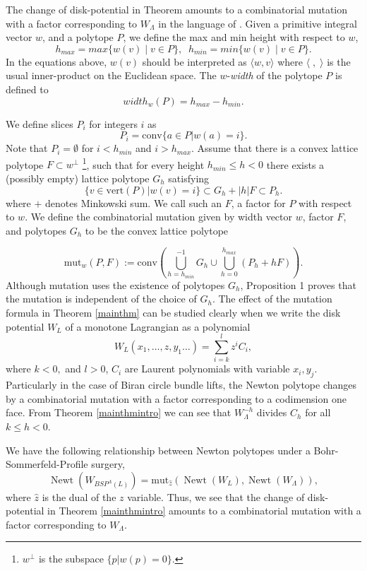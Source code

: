 \documentclass[11pt, oneside,dvipsnames]{amsart}
\newcommand{\sub}{\subset}
\newcommand{\<}{\langle}
\renewcommand{\>}{\rangle}
\DeclareMathOperator{\newt}{Newt}
\theoremstyle{definition}
\theoremstyle{definition}
\numberwithin{equation}{subsection}
\begin{document}
The change of disk-potential in Theorem   amounts to a combinatorial mutation with a factor corresponding to $W_\Lambda$ in the language of \cite{minksum}. Given a primitive integral vector $w$, and a polytope $P$, we define the max and min height with respect to $ w$, $$h_{max} = max\{ w(v) \mid v\in P  \},\; \; h_{min} = min\{ w(v) \mid v\in P  \} .$$ 
In the equations above, $w(v)$ should be interpreted as $\langle w,v \rangle$ where  $\langle \;,\; \rangle$ is the usual inner-product on the Euclidean space.  The $w$-\textit{width} of the polytope $P$ is defined to  $$width_w(P ) = h_{max}-h_{min}.$$

\noindent We define slices $P_i$ for integers $i$ as $$P_i = \text{conv} \{ a\in P | w(a) = i \}.$$ Note that $P_i = \emptyset$ for $i< h_{min}$ and $i>h_{max}$. Assume that there is a  convex lattice polytope $F \sub w^\perp$ \footnote{ $w^\perp$ is the subspace $\{ p | w(p) = 0 \}$.}, such that for every height $h_{min} \leq h < 0$ there exists a (possibly empty) lattice polytope $G_h$ satisfying  $$\{ v \in \text{vert}(P) | w(v) = i \} \subset G_h + |h| F \subset P_h.$$
where  $+$ denotes Minkowski sum. We call such an $F$, a factor for $P$ with respect to $w$. We define the combinatorial mutation given by width vector $w$, factor $F$, and polytopes {$G_h$} to be the convex lattice polytope


$$\text{mut}_{w}(P,F) := \text{conv}\left(  \bigcup_{h=h_{min}}^{-1}G_h \cup \bigcup_{h=0}^{h_{max}} \left(P_h + hF\right)   \right).$$
\noindent Although mutation uses the existence of polytopes $G_h$,  Proposition 1 \cite{minksum} proves that the mutation is independent of the choice of $G_h$.  
The effect of the mutation formula in Theorem \ref{mainthm} can be studied clearly when we write the disk potential $W_L$ of a monotone Lagrangian   as a polynomial $$W_L(x_1,\dots, z , y_1 \dots) = \sum_{i=k}^l z^iC_i,$$
where $k<0,$ and  $l>0$, $C_i$ are Laurent polynomials with variable $x_i,y_j$.
Particularly in the case of Biran circle bundle lifts, the Newton polytope changes by a combinatorial mutation with a factor corresponding to a codimension one face. From Theorem \ref{mainthmintro} we can see that $W_\Lambda^{-h}$ divides $C_h$ for all $k \leq h < 0$.

We have the following relationship between Newton polytopes under a Bohr-Sommerfeld-Profile surgery, $$\newt(W_{BSP^{\Lambda}(L)}) = \text{mut}_{\hat z}(\newt(W_L),\newt(W_\Lambda)),$$
 where $\hat z$ is the dual of the $z$ variable. Thus,  we see that the change of disk-potential in Theorem \ref{mainthmintro}  amounts to a combinatorial mutation with a factor corresponding to $W_\Lambda$.
\end{document}
